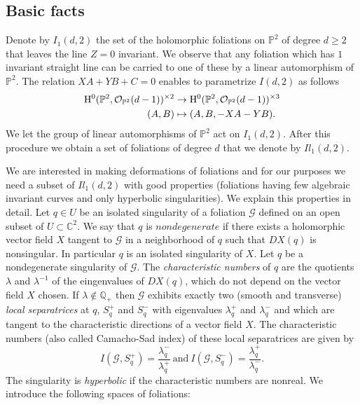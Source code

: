 \documentclass{amsart}
\theoremstyle{definition}
\theoremstyle{proposition}
\numberwithin{equation}{section}
\theoremstyle{main}
\begin{document}
\subsection{Basic facts} 
Denote by $I_1(d,2)$ the set of the holomorphic foliations on $\mathbb P^{2}$ of degree $d \geq 2$ that leaves the line $Z=0$ invariant. We observe that any foliation which has $1$ invariant straight line can be carried to one of  these by a linear automorphism of $\mathbb P^{2}$.
The relation
$XA+YB+C=0$
enables to parametrize $I(d,2)$  as follows
\begin{align*}
  {\rm {H}}^0(\mathbb P^2,\mathcal O_{\mathbb P^2}(d-1))^{\times 2}  &\to {\rm {H}}^0(\mathbb P^2,\mathcal O_{\mathbb P^2}(d-1))^{\times 3} \\
                         (A,B) &\mapsto (A,B,-XA-YB).
\end{align*}
We let the group of linear automorphisms of $\mathbb P^{2}$ act on $I_1(d,2)$. After this procedure we obtain a set of foliations of degree $d$ that we denote by $Il_{1}(d,2)$.\par We are interested in making deformations of foliations and for our purposes we need a subset of  $Il_{1}(d,2)$ with good properties (foliations having few algebraic invariant curves and only hyperbolic singularities). We explain this properties in detail. Let $q \in U$ be an isolated singularity of a foliation $\mathcal G$ 
defined on an open subset of $U\subset \mathbb C^{2}.$ We say that $q$ is $nondegenerate$ if there exists a holomorphic vector field $X$ tangent to  $\mathcal G$ in a neighborhood of $q$ such that $DX(q)$ is nonsingular. In particular $q$ is an isolated singularity of $X.$
Let $q$ be a nondegenerate singularity of $\mathcal G$. The \textit{characteristic numbers} of $q$ are the quotients $\lambda$ and $\lambda^{-1}$ of the eingenvalues of $DX(q)$, which do not depend on the vector field $X$ chosen. If $\lambda \notin \mathbb Q_{+}$ then $\mathcal G$ exhibits exactly two (smooth and transverse) \textit{local separatrices} at $q$,  $S_{q}^{+}$ and $S_{q}^{-}$ with eigenvalues $\lambda_{q}^{+}$ and $\lambda_{q}^{-}$ and which are tangent to the characteristic directions of a vector field $X$. The characteristic numbers (also called Camacho-Sad index) of these local separatrices are given by 
$$I(\mathcal G,S_{q}^{+})=\frac{\lambda_{q}^{-}}{\lambda_{q}^{+}} \ \text{and} \
I(\mathcal G,S_{q}^{-})=\frac{\lambda_{q}^{+}}{\lambda_{q}^{-}}.$$
The singularity is \textit{hyperbolic} if the characteristic numbers are nonreal. We introduce the following spaces of foliations:
\end{document}
